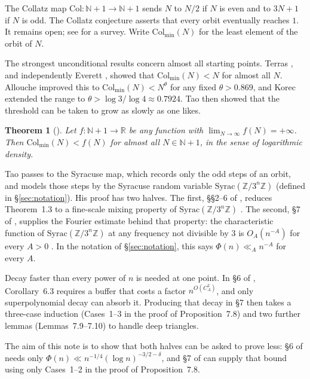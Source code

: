 \documentclass[11pt]{amsart}
\theoremstyle{remark}
\newcommand{\Z}{\mathbb{Z}}
\newcommand{\Syrac}{\mathrm{Syrac}}
\newcommand{\T}[1]{\cite[#1]{Tao22}}   %
\newcommand{\Tc}{\cite{Tao22}}         %
\newcommand{\Col}{\mathrm{Col}}
\newcommand{\Colmin}{\mathrm{Col}_{\min}}
\theoremstyle{plain}
\newtheorem*{thmT}{Theorem}
\begin{document}
The Collatz map $\Col\colon\mathbb N+1\to\mathbb N+1$ sends $N$ to $N/2$ if $N$ is even and to $3N+1$ if $N$ is odd. The Collatz conjecture asserts that every orbit eventually reaches $1$. It remains open; see \cite{Lag85} for a survey. Write $\Colmin(N)$ for the least element of the orbit of $N$.

The strongest unconditional results concern almost all starting points. Terras \cite{Ter76}, and independently Everett \cite{Eve77}, showed that $\Colmin(N)<N$ for almost all $N$. Allouche \cite{All79} improved this to $\Colmin(N)<N^{\theta}$ for any fixed $\theta>0.869$, and Korec \cite{Kor94} extended the range to $\theta>\log3/\log4\approx0.7924$. Tao \Tc{} then showed that the threshold can be taken to grow as slowly as one likes.

\begin{thmT}[{\T{Theorem 1.3}}]
Let $f\colon\mathbb N+1\to\mathbb R$ be any function with $\lim_{N\to\infty}f(N)=+\infty$. Then $\Colmin(N)<f(N)$ for almost all $N\in\mathbb N+1$, in the sense of logarithmic density.
\end{thmT}

Tao passes to the Syracuse map, which records only the odd steps of an orbit, and models those steps by the Syracuse random variable $\Syrac(\Z/3^n\Z)$ (defined in \S\ref{sec:notation}). His proof has two halves. The first, \S\S2--6 of \Tc, reduces Theorem~1.3 to a fine-scale mixing property of $\Syrac(\Z/3^n\Z)$ \T{Proposition 1.14}. The second, \S7 of \Tc, supplies the Fourier estimate behind that property: the characteristic function of $\Syrac(\Z/3^n\Z)$ at any frequency not divisible by $3$ is $O_A(n^{-A})$ for every $A>0$ \T{Proposition 1.17}. In the notation of \S\ref{sec:notation}, this says $\Phi(n)\ll_A n^{-A}$ for every $A$.

Decay faster than every power of $n$ is needed at one point. In \S6 of \Tc, Corollary~6.3 requires a buffer that costs a factor $n^{O(C_A^2)}$, and only superpolynomial decay can absorb it. Producing that decay in \S7 then takes a three-case induction (Cases~1--3 in the proof of Proposition~7.8) and two further lemmas (Lemmas~7.9--7.10) to handle deep triangles.

The aim of this note is to show that both halves can be asked to prove less: \S6 of \Tc{} needs only $\Phi(n)\ll n^{-1/4}(\log n)^{-3/2-\delta}$, and \S7 of \Tc{} can supply that bound using only Cases~1--2 in the proof of Proposition~7.8.
\end{document}
